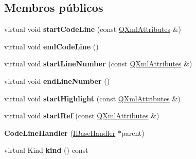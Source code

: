 \subsection*{Membros públicos}
\begin{DoxyCompactItemize}
\item 
\hypertarget{class_code_line_handler_a65896bd5afdbb5e1465384b26f009b6b}{virtual void {\bfseries start\-Code\-Line} (const \hyperlink{class_q_xml_attributes}{Q\-Xml\-Attributes} \&)}\label{class_code_line_handler_a65896bd5afdbb5e1465384b26f009b6b}

\item 
\hypertarget{class_code_line_handler_adbe51a89cf6f9573b3434e7cfda81a7c}{virtual void {\bfseries end\-Code\-Line} ()}\label{class_code_line_handler_adbe51a89cf6f9573b3434e7cfda81a7c}

\item 
\hypertarget{class_code_line_handler_a6c05366909c31e60e5aba2ba1b93fefc}{virtual void {\bfseries start\-Line\-Number} (const \hyperlink{class_q_xml_attributes}{Q\-Xml\-Attributes} \&)}\label{class_code_line_handler_a6c05366909c31e60e5aba2ba1b93fefc}

\item 
\hypertarget{class_code_line_handler_a7a0edc3108f620b96b4972a7dea9ad91}{virtual void {\bfseries end\-Line\-Number} ()}\label{class_code_line_handler_a7a0edc3108f620b96b4972a7dea9ad91}

\item 
\hypertarget{class_code_line_handler_a30584c200aabd5885bd426b9e09c851d}{virtual void {\bfseries start\-Highlight} (const \hyperlink{class_q_xml_attributes}{Q\-Xml\-Attributes} \&)}\label{class_code_line_handler_a30584c200aabd5885bd426b9e09c851d}

\item 
\hypertarget{class_code_line_handler_a0a6ad84c50fcae905559fdcc3ca40e3c}{virtual void {\bfseries start\-Ref} (const \hyperlink{class_q_xml_attributes}{Q\-Xml\-Attributes} \&)}\label{class_code_line_handler_a0a6ad84c50fcae905559fdcc3ca40e3c}

\item 
\hypertarget{class_code_line_handler_a9b2a2f7a9ebcece375f433435d5fd615}{{\bfseries Code\-Line\-Handler} (\hyperlink{class_i_base_handler}{I\-Base\-Handler} $\ast$parent)}\label{class_code_line_handler_a9b2a2f7a9ebcece375f433435d5fd615}

\item 
\hypertarget{class_code_line_handler_af8e62c8a81ddf2283205cc8955de50eb}{virtual Kind {\bfseries kind} () const }\label{class_code_line_handler_af8e62c8a81ddf2283205cc8955de50eb}


\end{DoxyCompactItemize}
